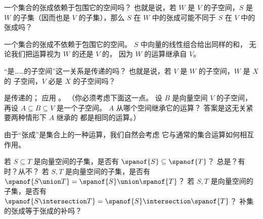     一个集合的张成依赖于包围它的空间吗？
    也就是说，若 \( W \) 是 \( V \) 的子空间，\( S \) 是
    \( W \) 的子集（因而也是 \( V \) 的子集），那么 \( S \) 在
    \( W \) 中的张成可能不同于 \( S \) 在 \( V \) 中的张成吗？
    \begin{answer}
      一个集合的张成不依赖于包围它的空间。
      \( S \) 中向量的线性组合给出同样的和，
      无论我们把运算视为 \( W \) 的还是 \( V \) 的，
      因为 \( W \) 的运算继承自 \(  V \)。  
    \end{answer}
  \item 
    “是……的子空间”这一关系是传递的吗？
    也就是说，若 $V$ 是 $W$ 的子空间，$W$ 是 $X$ 的
    子空间，$V$ 必是 $X$ 的子空间吗？ 
    \begin{answer}
      是传递的；
      应用 。
      （你必须考虑下面这一点。
      设 \( B \) 是向量空间 \( V \) 的子空间，再设
      \( A\subseteq B\subseteq V \) 是一个子空间。
      \( A \) 从哪个空间继承它的运算？
      答案是这无关紧要\Dash 两种情形下 \( A \) 继承的
      都是相同的运算。）  
    \end{answer}
  \item
    由于“张成”是集合上的一种运算，我们自然会考虑
    它与通常的集合运算如何相互作用。
    \begin{exparts}
      \partsitem 若 \( S\subseteq T \) 是向量空间的子集，是否有
        \( \spanof{S}\subseteq\spanof{T} \)？
        总是？有时？从不？
      \partsitem 若 \( S,T \) 是向量空间的子集，是否有
        \( \spanof{S\union T}=\spanof{S}\union\spanof{T} \)？
      \partsitem 若 \( S,T \) 是向量空间的子集，是否有
        \( \spanof{S\intersection T}=\spanof{S}\intersection\spanof{T} \)？
      \partsitem 补集的张成等于张成的补吗？
    \end{exparts}
